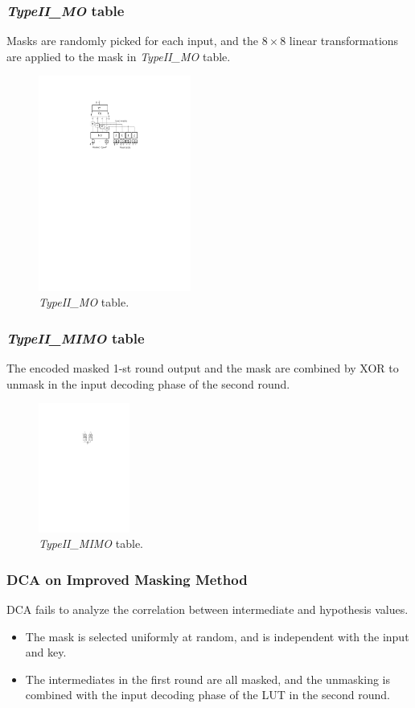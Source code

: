 \documentclass{beamer}
\begin{document}
\frame
{
	\frametitle{\textit{TypeII\_MO} table}
	Masks are randomly picked for each input, and the $8\times 8$ linear transformations are applied to the mask in \textit{TypeII\_MO} table.
	\begin{figure}
		\centering
		\includegraphics[width=5cm]{./pics/IIMO.pdf}
		\caption{\textit{TypeII\_MO} table.}
	\end{figure}
}

\frame
{
	\frametitle{\textit{TypeII\_MIMO} table}
	The encoded masked 1-st round output and the mask are combined by XOR to unmask in the input decoding phase of the second round.
	\begin{figure}
		\centering
		\includegraphics[width=3.0cm]{./pics/IIMIMO.pdf}
		\caption{\textit{TypeII\_MIMO} table.}
	\end{figure}
}

\frame
{
	\frametitle{DCA on Improved Masking Method}
	DCA fails to analyze the correlation between intermediate and hypothesis values.
	\begin{itemize}
		\item The mask is selected uniformly at random, and is independent with the input and key.
		\item The intermediates in the first round are all masked, and the unmasking is combined with the input decoding phase of the LUT in the second round.
	\end{itemize}
}
\end{document}
